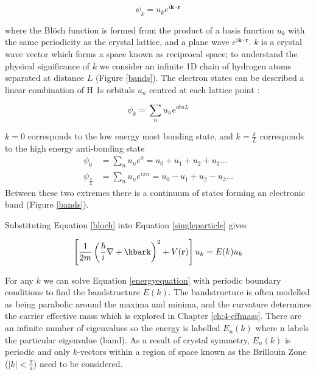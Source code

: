 \begin{equation} 
\psi_{k} = u_ke^{i\textbf{k}\cdot\textbf{r}}
\label{bloch}
\end{equation}   %

where the Bl\"{o}ch function is formed from the product of a basis function $u_k$ with the same periodicity as the crystal lattice, and a plane wave $e^{i\textbf{k}\cdot\textbf{r}}$. $k$ is a crystal wave vector which forms a space known as reciprocal space; to understand the physical significance of $k$ we consider an infinite 1D chain of hydrogen atoms separated at distance $L$ (Figure \ref{bands}). The electron states can be described a linear combination of H 1s orbitals $u_n$ centred at each lattice point :

\begin{equation} \label{1dbloch}
\psi_k = \sum_nu_ne^{iknL}
\end{equation}

$k=0$ corresponds to the low energy most bonding state, and $k=\frac{\pi}{L}$ corresponds to the high energy anti-bonding state
\begin{align}
\psi_0 &= \sum_nu_ne^0 = u_0 +u_1 +u_2 +u_3 \dots \\
\psi_{\frac{\pi}{L}} &= \sum_nu_ne^{i\pi n} = u_0 -u_1+u_2-u_3 \dots
\end{align}
Between these two extremes there is a continuum of states forming an electronic band (Figure \ref{bands}). 

Substituting Equation \ref{bloch} into Equation \ref{singleparticle} gives

\begin{equation} \label{energyequation}
\left[\frac{1}{2m}\left(\frac{\hbar}{i}\nabla+\hbark\right)^2+V(\textbf{r})\right]u_k = E(k)u_k
\end{equation}

For any $k$ we can solve Equation \ref{energyequation} with periodic boundary conditions to find the bandstructure $E(k)$. The bandstructure is often modelled as being parabolic around the maxima and minima, and the curvature determines the carrier effective mass which is explored in Chapter \ref{ch:4-effmass}. There are an infinite number of eigenvalues so the energy is labelled $E_n(k)$ where n labels the particular eigenvalue (band). As a result of crystal symmetry, $E_n(k)$ is periodic and only $k$-vectors within a region of space known as the Brillouin Zone ($|k|<\frac{\pi}{a}$) need to be considered. %

